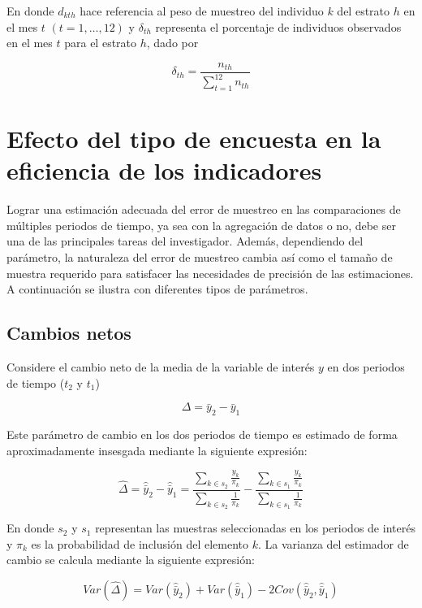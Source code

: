 \documentclass[
  12pt,
  spanish,
]{book}
\begin{document}
En donde \(d_{kth}\) hace referencia al peso de muestreo del individuo \(k\)
del estrato \(h\) en el mes \(t\) \((t=1, \ldots, 12)\) y \(\delta_{th}\)
representa el porcentaje de individuos observados en el mes \(t\) para
el estrato \(h\), dado por

\[
\delta_{th} = \frac{n_{th}}{\sum_{t = 1} ^{12} n_{th}}
\]

\hypertarget{efecto-del-tipo-de-encuesta-en-la-eficiencia-de-los-indicadores}{%
\section{Efecto del tipo de encuesta en la eficiencia de los indicadores}\label{efecto-del-tipo-de-encuesta-en-la-eficiencia-de-los-indicadores}}

Lograr una estimación adecuada del error de muestreo en las
comparaciones de múltiples periodos de tiempo, ya sea con la agregación
de datos o no, debe ser una de las principales tareas del investigador.
Además, dependiendo del parámetro, la naturaleza del error de muestreo
cambia así como el tamaño de muestra requerido para satisfacer las
necesidades de precisión de las estimaciones. A continuación se ilustra con diferentes tipos de parámetros.

\hypertarget{cambios-netos}{%
\subsection{Cambios netos}\label{cambios-netos}}

Considere el cambio neto de la media de la variable de
interés \(y\) en dos periodos de tiempo (\(t_2\) y \(t_1\))

\[
\Delta = \bar{y}_2 - \bar{y}_1
\]

Este parámetro de cambio en los dos periodos de tiempo es estimado de
forma aproximadamente insesgada mediante la siguiente expresión:

\[
\hat{\Delta} = 
\hat{\bar{y}}_2 - \hat{\bar{y}}_1
= \frac{\sum_{k\in s_2}\frac{y_{k}}{\pi_k}}{\sum_{k\in s_2}\frac{1}{\pi_k}} - \frac{\sum_{k\in s_1}\frac{y_{k}}{\pi_k}}{\sum_{k\in s_1}\frac{1}{\pi_k}}
\]

En donde \(s_2\) y \(s_1\) representan las muestras seleccionadas en los
periodos de interés y \(\pi_k\) es la probabilidad de inclusión del
elemento \(k\). La varianza del estimador de cambio se calcula mediante la
siguiente expresión:

\[
Var(\hat{\Delta}) = Var(\hat{\bar{y}}_2) + Var(\hat{\bar{y}}_1) - 2Cov(\hat{\bar{y}}_2, \hat{\bar{y}}_1)
\]
\end{document}
